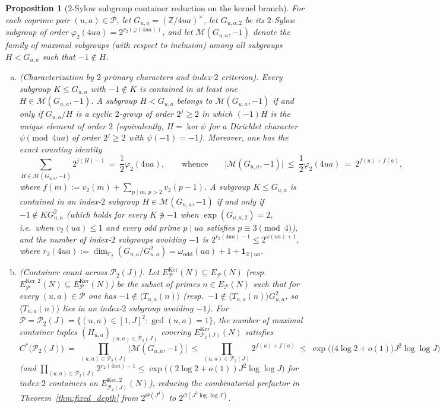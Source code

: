 \documentclass[11pt, a4paper]{article}
\theoremstyle{plain}
\newtheorem{proposition}[theorem]{Proposition}
\theoremstyle{definition}
\newcommand{\Z}{\mathbb{Z}}
\begin{document}
\begin{proposition}[$2$-Sylow subgroup container reduction on the kernel branch]\label{prop:sylow_kernel_reduction_preview}
For each coprime pair $(u,a)\in\mathcal{P}$, let $G_{u,a}=(\Z/4ua)^{\times}$, let $G_{u,a,2}$ be its $2$-Sylow subgroup of order $\varphi_2(4ua)=2^{v_2(\varphi(4ua))}$, and let $\mathcal{M}(G_{u,a},-1)$ denote the family of maximal subgroups (with respect to inclusion) among all subgroups $H<G_{u,a}$ such that $-1\notin H$.
\begin{enumerate}[(a)]
    \item \emph{(Characterization by $2$-primary characters and index-$2$ criterion).} Every subgroup $K\le G_{u,a}$ with $-1\notin K$ is contained in at least one $H\in\mathcal{M}(G_{u,a},-1)$. A subgroup $H<G_{u,a}$ belongs to $\mathcal{M}(G_{u,a},-1)$ if and only if $G_{u,a}/H$ is a cyclic $2$-group of order $2^{j}\ge2$ in which $(-1)H$ is the unique element of order $2$ (equivalently, $H=\ker\psi$ for a Dirichlet character $\psi\pmod{4ua}$ of order $2^{j}\ge2$ with $\psi(-1)=-1$). Moreover, one has the exact counting identity
    $$\sum_{H\in\mathcal{M}(G_{u,a},-1)}2^{j(H)-1}\ =\ \frac12\varphi_2(4ua),\qquad\text{whence}\qquad\big|\mathcal{M}(G_{u,a},-1)\big|\ \le\ \frac12\varphi_2(4ua)\ =\ 2^{f(u)+f(a)},$$
    where $f(m):=v_2(m)+\sum_{p\mid m,\,p>2}v_2(p-1)$. A subgroup $K\le G_{u,a}$ is contained in an \emph{index-$2$} subgroup $H\in\mathcal{M}(G_{u,a},-1)$ if and only if $-1\notin K G_{u,a}^{2}$ (which holds for every $K\not\ni -1$ when $\exp(G_{u,a,2})=2$, i.e.\ when $v_2(ua)\le 1$ and every odd prime $p\mid ua$ satisfies $p\equiv 3\pmod 4$), and the number of index-$2$ subgroups avoiding $-1$ is $2^{r_2(4ua)-1}\le 2^{\omega(ua)+1}$, where $r_2(4ua):=\dim_{\mathbb{F}_2}(G_{u,a}/G_{u,a}^{2})=\omega_{\mathrm{odd}}(ua)+1+\mathbf{1}_{2\mid ua}$.
    \item \emph{(Container count across $\mathcal{P}_2(J)$).} Let $E_{\mathcal{P}}^{\mathrm{Ker}}(N)\subseteq E_{\mathcal{P}}(N)$ (resp.\ $E_{\mathcal{P}}^{\mathrm{Ker,2}}(N)\subseteq E_{\mathcal{P}}^{\mathrm{Ker}}(N)$) be the subset of primes $n\in E_{\mathcal{P}}(N)$ such that for every $(u,a)\in\mathcal{P}$ one has $-1\notin\langle T_{u,a}(n)\rangle$ (resp.\ $-1\notin\langle T_{u,a}(n)\rangle G_{u,a}^{2}$, so $\langle T_{u,a}(n)\rangle$ lies in an index-$2$ subgroup avoiding $-1$). For $\mathcal{P}=\mathcal{P}_2(J)=\{(u,a)\in[1,J]^{2}:\gcd(u,a)=1\}$, the number of maximal container tuples $(H_{u,a})_{(u,a)\in\mathcal{P}_2(J)}$ covering $E_{\mathcal{P}_2(J)}^{\mathrm{Ker}}(N)$ satisfies
    $$C^{\ast}\big(\mathcal{P}_2(J)\big)\ =\ \prod_{(u,a)\in\mathcal{P}_2(J)}\big|\mathcal{M}(G_{u,a},-1)\big|\ \le\ \prod_{(u,a)\in\mathcal{P}_2(J)}2^{f(u)+f(a)}\ \le\ \exp\Big(\big(4\log 2+o(1)\big)J^{2}\log\log J\Big)$$
    (and $\prod_{(u,a)\in\mathcal{P}_2(J)} 2^{r_2(4ua)-1}\le\exp\big((2\log 2+o(1))J^{2}\log\log J\big)$ for index-$2$ containers on $E_{\mathcal{P}_2(J)}^{\mathrm{Ker,2}}(N)$), reducing the combinatorial prefactor in Theorem~\ref{thm:fixed_depth} from $2^{\Theta(J^{4})}$ to $2^{\mathcal{O}(J^{2}\log\log J)}$.
\end{enumerate}
\end{proposition}
\end{document}
